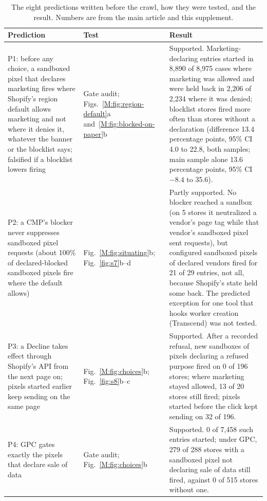 \documentclass[preprint,11pt,authoryear,a4paper]{elsarticle}
\begin{document}
\begin{table}[!htbp]
\centering
\caption{The eight predictions written before the crawl, how they were tested, and the result. Numbers are from the main article and this supplement.}
\label{tab:s-predictions}
\footnotesize
\begin{tabularx}{\textwidth}{@{}>{\raggedright\arraybackslash}p{}>{\raggedright\arraybackslash}p{}>{\raggedright\arraybackslash}X@{}}
\toprule
Prediction & Test & Result \\
\midrule
P1: before any choice, a sandboxed pixel that declares marketing fires where Shopify's region default allows marketing and not where it denies it, whatever the banner or the blocklist says; falsified if a blocklist lowers firing & Gate audit; Figs.~\ref*{M:fig:region-default}a and~\ref*{M:fig:blocked-on-paper}b & Supported. Marketing-declaring entries started in 8,890 of 8,975 cases where marketing was allowed and were held back in 2,206 of 2,234 where it was denied; blocklist stores fired more often than stores without a declaration (difference 13.4 percentage points, 95\% CI 4.0 to 22.8, both samples; main sample alone 13.6 percentage points, 95\% CI $-8.4$ to 35.6). \\
P2: a CMP's blocker never suppresses sandboxed pixel requests (about 100\% of declared-blocked sandboxed pixels fire where the default allows) & Fig.~\ref*{M:fig:situating}b; Fig.~\ref{fig:s7}b--d & Partly supported. No blocker reached a sandbox (on 5 stores it neutralized a vendor's page tag while that vendor's sandboxed pixel sent requests), but configured sandboxed pixels of declared vendors fired for 21 of 29 entries, not all, because Shopify's state held some back. The predicted exception for one tool that hooks worker creation (Transcend) was not tested. \\
P3: a Decline takes effect through Shopify's API from the next page on; pixels started earlier keep sending on the same page & Fig.~\ref*{M:fig:choices}b; Fig.~\ref{fig:s8}b--c & Supported. After a recorded refusal, new sandboxes of pixels declaring a refused purpose fired on 0 of 196 stores; where marketing stayed allowed, 13 of 20 stores still fired; pixels started before the click kept sending on 32 of 196. \\
P4: GPC gates exactly the pixels that declare sale of data & Gate audit; Fig.~\ref*{M:fig:choices}b & Supported. 0 of 7,458 such entries started; under GPC, 279 of 288 stores with a sandboxed pixel not declaring sale of data still fired, against 0 of 515 stores without one. \\

\end{tabularx}
\end{table}
\end{document}
